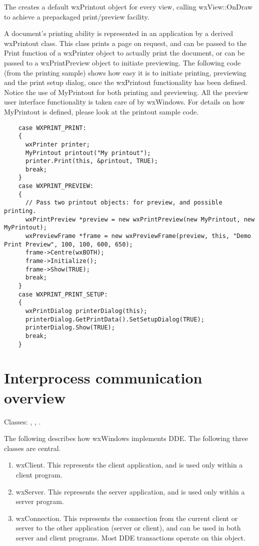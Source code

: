 The  creates a default wxPrintout
object for every view, calling wxView::OnDraw to achieve a
prepackaged print/preview facility.

A document's printing ability is represented in an application by a
derived wxPrintout class. This class prints a page on request, and can
be passed to the Print function of a wxPrinter object to actually print
the document, or can be passed to a wxPrintPreview object to initiate
previewing. The following code (from the printing sample) shows how easy
it is to initiate printing, previewing and the print setup dialog, once the wxPrintout
functionality has been defined. Notice the use of MyPrintout for
both printing and previewing. All the preview user interface functionality
is taken care of by wxWindows. For details on how MyPrintout is defined,
please look at the printout sample code.

\begin{verbatim}
    case WXPRINT_PRINT:
    {
      wxPrinter printer;
      MyPrintout printout("My printout");
      printer.Print(this, &printout, TRUE);
      break;
    }
    case WXPRINT_PREVIEW:
    {
      // Pass two printout objects: for preview, and possible printing.
      wxPrintPreview *preview = new wxPrintPreview(new MyPrintout, new MyPrintout);
      wxPreviewFrame *frame = new wxPreviewFrame(preview, this, "Demo Print Preview", 100, 100, 600, 650);
      frame->Centre(wxBOTH);
      frame->Initialize();
      frame->Show(TRUE);
      break;
    }
    case WXPRINT_PRINT_SETUP:
    {
      wxPrintDialog printerDialog(this);
      printerDialog.GetPrintData().SetSetupDialog(TRUE);
      printerDialog.Show(TRUE);
      break;
    }
\end{verbatim}

\section{Interprocess communication overview}\label{ipcoverview}

Classes: , ,
\rtfsp{}.

The following describes how wxWindows implements DDE.  The following
three classes are central.

\begin{enumerate}\itemsep=0pt
\item wxClient. This represents the client application, and is used
only within a client program.
\item wxServer. This represents the server application, and is used
only within a server program.
\item wxConnection. This represents the connection from the current
client or server to the other application (server or client), and can be used
in both server and client programs. Most DDE
transactions operate on this object.
\end{enumerate}


